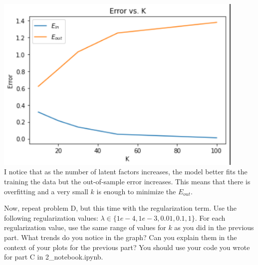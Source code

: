 \begin{solution}
	\\ \includegraphics[width=12cm]{plots/Problem_2D.png} \\
	I notice that as the number of latent factors increases, the model better fits the training the data but the out-of-sample error increases. This means that there is overfitting and a very small $k$ is enough to minimize the $E_{out}$.
\end{solution}

\problem[5]Now, repeat problem D, but this time with the regularization term. Use the following regularization values: $\lambda \in \{1e-4, 1e-3, 0.01, 0.1, 1\}$. For each regularization value, use the same range of values for $k$ as you did in the previous part. What trends do you notice in the graph? Can you explain them in the context of your plots for the previous part? You should use your code you wrote for part C in 2_notebook.ipynb.


